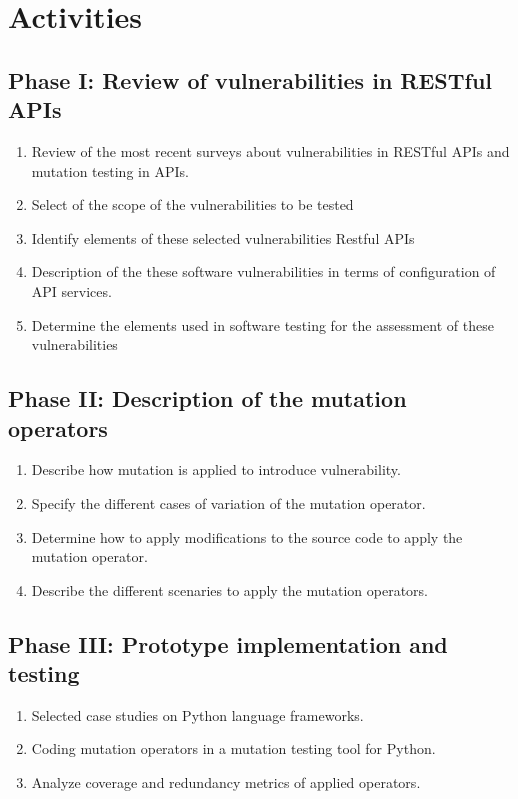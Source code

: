 \section{Activities}

\subsection{Phase I: Review of vulnerabilities in RESTful APIs}

\begin{enumerate}
    \item Review of the most recent surveys about vulnerabilities in RESTful APIs and mutation testing in APIs.
    \item Select of the scope of the vulnerabilities to be tested
    \item Identify elements of these selected vulnerabilities Restful APIs
    \item Description of the these software vulnerabilities in terms of configuration of API services.
    \item Determine the elements used in software testing for the assessment of these vulnerabilities
\end{enumerate}

\subsection{Phase II: Description of the mutation operators}

\begin{enumerate}
    \item Describe how mutation is applied to introduce vulnerability.
    \item Specify the different cases of variation of the mutation operator.
    \item Determine how to apply modifications to the source code to apply the mutation operator.
    \item Describe the different scenaries to apply the mutation operators.
\end{enumerate}

\subsection{Phase III: Prototype implementation and testing}

\begin{enumerate}
    \item Selected case studies on Python language frameworks.
    \item Coding mutation operators in a mutation testing tool for Python.
    \item Analyze coverage and redundancy metrics of applied operators.
\end{enumerate}
